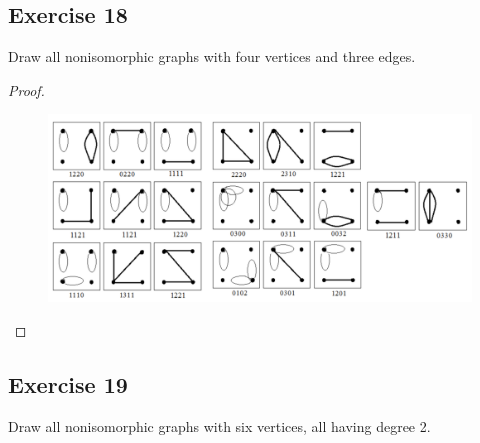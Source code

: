 \documentclass[14pt]{extarticle}
\begin{document}
\subsection{Exercise 18}
Draw all nonisomorphic graphs with four vertices and three edges.

\begin{proof}
    \begin{figure}[ht!]
        \centering
        \includegraphics[scale=0.38]{../images/10.3.18.png}
    \end{figure}
\end{proof}

\subsection{Exercise 19}
Draw all nonisomorphic graphs with six vertices, all having degree 2.
\end{document}
